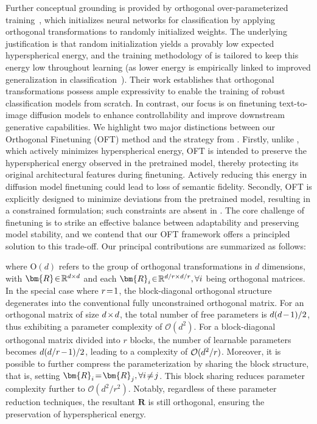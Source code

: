 Further conceptual grounding is provided by orthogonal over-parameterized training~\cite{liu2021orthogonal}, which initializes neural networks for classification by applying orthogonal transformations to randomly initialized weights. The underlying justification is that random initialization yields a provably low expected hyperspherical energy, and the training methodology of \cite{liu2021orthogonal} is tailored to keep this energy low throughout learning (as lower energy is empirically linked to improved generalization in classification~\cite{liu2018learning,lin2020regularizing}). Their work establishes that orthogonal transformations possess ample expressivity to enable the training of robust classification models from scratch. In contrast, our focus is on finetuning text-to-image diffusion models to enhance controllability and improve downstream generative capabilities. We highlight two major distinctions between our Orthogonal Finetuning (OFT) method and the strategy from \cite{liu2021orthogonal}. Firstly, unlike \cite{liu2021orthogonal}, which actively minimizes hyperspherical energy, OFT is intended to preserve the hyperspherical energy observed in the pretrained model, thereby protecting its original architectural features during finetuning. Actively reducing this energy in diffusion model finetuning could lead to loss of semantic fidelity. Secondly, OFT is explicitly designed to minimize deviations from the pretrained model, resulting in a constrained formulation; such constraints are absent in \cite{liu2021orthogonal}. The core challenge of finetuning is to strike an effective balance between adaptability and preserving model stability, and we contend that our OFT framework offers a principled solution to this trade-off. Our principal contributions are summarized as follows:

where $\text{O}(d)$ refers to the group of orthogonal transformations in $d$ dimensions, with $\thickmuskip=2mu \medmuskip=2mu \bm{R}\in\mathbb{R}^{d\times d}$ and each $\thickmuskip=2mu \medmuskip=2mu \bm{R}_i\in\mathbb{R}^{d/r\times d/r},\forall i$ being orthogonal matrices. In the special case where $\thickmuskip=2mu \medmuskip=2mu r=1$, the block-diagonal orthogonal structure degenerates into the conventional fully unconstrained orthogonal matrix. For an orthogonal matrix of size $\thickmuskip=2mu \medmuskip=2mu d\times d$, the total number of free parameters is $\thickmuskip=2mu \medmuskip=2mu d(d-1)/2$, thus exhibiting a parameter complexity of $\mathcal{O}(d^2)$. For a block-diagonal orthogonal matrix divided into $r$ blocks, the number of learnable parameters becomes $\thickmuskip=2mu \medmuskip=2mu d(d/r-1)/2$, leading to a complexity of $\thickmuskip=2mu \medmuskip=2mu \mathcal{O}(d^2/r)$. Moreover, it is possible to further compress the parameterization by sharing the block structure, that is, setting $\thickmuskip=2mu \medmuskip=2mu\bm{R}_i=\bm{R}_j,\forall i\neq j$. This block sharing reduces parameter complexity further to $\mathcal{O}(d^2/r^2)$. Notably, regardless of these parameter reduction techniques, the resultant $\bm{R}$ is still orthogonal, ensuring the preservation of hyperspherical energy.

